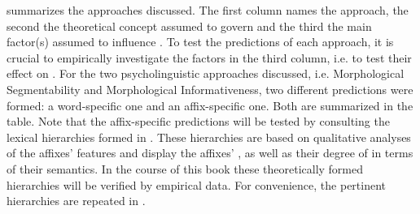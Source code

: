  summarizes the approaches discussed. The first column names the approach, the second the theoretical concept assumed to govern  and the third the main factor(s) assumed to influence . To test the predictions of each approach, it is crucial to empirically investigate the factors in the third column, i.e. to test their effect on .
For the two psycholinguistic approaches discussed, i.e. Morphological Segmentability and Morphological Informativeness, two different predictions were formed: a word-specific one and an affix-specific one. Both are summarized in the table. Note that the affix-specific predictions will be tested by consulting the lexical  hierarchies formed in . These hierarchies are based on qualitative analyses of the affixes' features and display the affixes' , as well as their degree of  in terms of their semantics. In the course of this book these theoretically formed hierarchies will be verified by empirical data. For convenience, the pertinent hierarchies are repeated in .  

\begin{table}
 	\caption{Lexical segmentability hierarchies of  affixes}
 	\label{fig:Lexical segmentability hierarchies of  affixes repetition} 
 \end{table}


